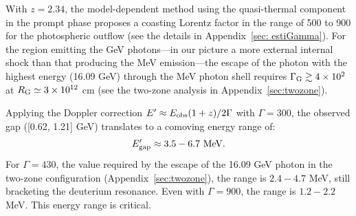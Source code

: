 \documentclass[prd,twocolumn,amsmath,amssymb,aps,linenumbers]{revtex4-2} %
\begin{document}
With $z=2.34$, the model-dependent method using the quasi-thermal component in the prompt phase proposes a coasting Lorentz factor in the range of 500 to 900 for the photospheric outflow (see the details in Appendix~\ref{sec: estiGamma}). For the region emitting the GeV photons---in our picture a more external internal shock than that producing the MeV emission---the escape of the photon with the highest energy (16.09 GeV) through the MeV photon shell requires $\Gamma_{\rm G}\gtrsim4\times10^{2}$ at $R_{\rm G}\simeq3\times10^{12}$ cm (see the two-zone analysis in Appendix~\ref{sec:twozone}).


Applying the Doppler correction $E' \approx E_{\rm obs} (1+z) / 2\Gamma$ with $\Gamma=300$, the observed gap ([0.62, 1.21] GeV) translates to a comoving energy range of:
\begin{equation}
E_{\rm gap}^{\prime} \approx 3.5 - 6.7 \text{ MeV}.
\end{equation}
For $\Gamma=430$, the value required by the escape of the 16.09 GeV photon in the two-zone configuration (Appendix~\ref{sec:twozone}), the range is $2.4-4.7$ MeV, still bracketing the deuterium resonance. Even with $\Gamma=900$, the range is $1.2-2.2$ MeV. This energy range is critical.
\end{document}

